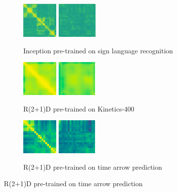 \documentclass[final]{cvpr}
\begin{document}
\begin{figure}[h]
	\begin{subfigure}[t]{0.5\linewidth}
		\centering\captionsetup{width=.9\linewidth, justification=raggedright}
		\includegraphics[height=1.8cm]{fig/matrices/a_2d}
		\includegraphics[height=1.8cm]{fig/matrices/b_2d}
		\caption{\centering Inception pre-trained on sign language recognition}
	\end{subfigure}\hfill
	\begin{subfigure}[t]{0.5\linewidth}
		\centering\captionsetup{width=.9\linewidth, justification=raggedright}
		\includegraphics[height=1.8cm]{fig/matrices/a_kinetics}
		\includegraphics[height=1.8cm]{fig/matrices/b_kinetics}
		\caption{\centering R(2+1)D pre-trained on Kinetics-400}
	\end{subfigure}
	\par\medskip
	\begin{subfigure}[t]{0.5\linewidth}
		\centering\captionsetup{width=.9\linewidth, justification=raggedright}
		\includegraphics[height=1.8cm]{fig/matrices/a_tarrow}
		\includegraphics[height=1.8cm]{fig/matrices/b_tarrow}
		\caption{\centering R(2+1)D pre-trained on time arrow prediction}

\end{subfigure}
\end{figure}
\end{document}
